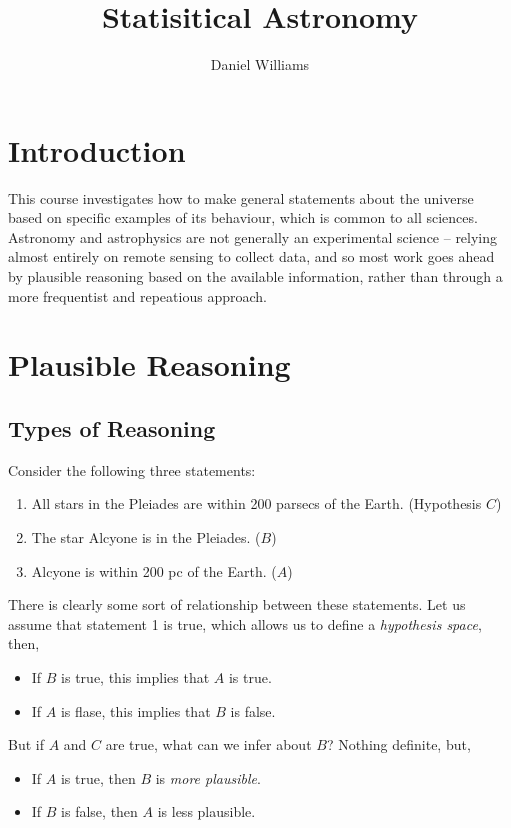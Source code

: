 \documentclass{dwnotes}         		        %
\title{Statisitical Astronomy}
\author{Daniel Williams}
\date{}
\begin{document}
\maketitle

\tableofcontents

\section{Introduction}
\label{sec:intro}

This course investigates how to make general statements about the
universe based on specific examples of its behaviour, which is common
to all sciences. \\ Astronomy and astrophysics are not generally an
experimental science -- relying almost entirely on remote sensing to
collect data, and so most work goes ahead by plausible reasoning based
on the available information, rather than through a more frequentist
and repeatious approach.

\section{Plausible Reasoning}
\label{sec:reasoning}

\subsection{Types of Reasoning}
\label{sec:types}

Consider the following three statements:
\begin{enumerate}
\item All stars in the Pleiades are within 200 parsecs of the
  Earth. (Hypothesis $C$)
\item The star Alcyone is in the Pleiades. ($B$)
\item Alcyone is within 200 pc of the Earth. ($A$)
\end{enumerate}
There is clearly some sort of relationship between these
statements. Let us assume that statement 1 is true, which allows us to
define a {\em hypothesis space}, then,
\begin{itemize}
\item If $B$ is true, this implies that $A$ is true.
\item If $A$ is flase, this implies that $B$ is false.
\end{itemize}
But if $A$ and $C$ are true, what can we infer about $B$? Nothing
definite, but,
\begin{itemize}
\item If $A$ is true, then $B$ is {\em more plausible}.
\item If $B$ is false, then $A$ is less plausible.
\end{itemize}
\end{document}
